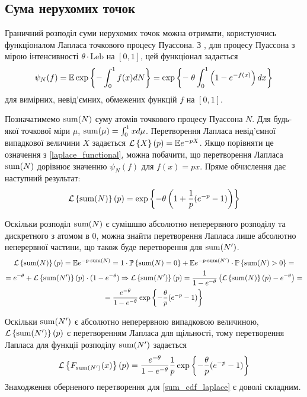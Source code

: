 \subsection{Сума нерухомих точок}
Граничний розподіл суми нерухомих точок можна отримати, користуючись функціоналом Лапласа точкового процесу Пуассона.
З \cite{Resnick_2007}, для процесу Пуассона з мірою інтенсивності $\theta \cdot \mathrm{Leb}$ на $[0, 1]$, цей функціонал задається
\begin{equation}\label{laplace_functional}
    \psi_N(f) = \mathbb{E} \exp\left\{-\int_0^1 f (x) dN \right\}= \exp\left\{ - \; \theta \int_0^1 \left(1 - e^{-f(x)}\right) dx\right\}
\end{equation}
для вимірних, невід'ємних, обмежених функцій $f$ на $[0, 1]$.

Позначатимемо $\operatorname{sum}(N)$ суму атомів точкового процесу Пуассона $N$. 
Для будь-якої точкової міри $\mu$, 
$\operatorname{sum}(\mu) = \int_0^1 x d\mu$. 
Перетворення Лапласа невід'ємної випадкової величини $X$ задається
$\mathcal{L}\left\{X\right\}(p) = \mathbb{E} e^{-pX}$. 
Якщо порівняти це означення з \eqref{laplace_functional}, можна побачити, що
перетворення Лапласа $\operatorname{sum}(N)$ дорівнює значенню $\psi_N(f)$ для $f(x) = px$.
Пряме обчислення дає наступний результат:
\begin{gather}
    \mathcal{L}\left\{\operatorname{sum}(N)\right\}(p) = 
    \exp\left\{- \theta \left( 1 + \frac{1}{p}(e^{-p} - 1)\right) \right\}
\end{gather}

Оскільки розподіл $\operatorname{sum}(N)$ є сумішшю абсолютно неперервного розподілу та
дискретного з атомом в 0, можна знайти перетворення Лапласа
лише абсолютно неперервної частини, що також буде перетворення для
$\operatorname{sum}(N')$.
\begin{gather*}
    \mathcal{L}\left\{\operatorname{sum}(N)\right\}(p) = \mathbb{E} e^{-p\cdot\operatorname{sum}(N)} = 
    1 \cdot \mathbb{P}\left\{\operatorname{sum}(N) = 0\right\} +
    \mathbb{E} e^{-p\cdot\operatorname{sum}(N')} \cdot \mathbb{P}\left\{\operatorname{sum}(N) > 0\right\} = \\ =
    e^{-\theta} + \mathcal{L}\left\{\operatorname{sum}(N')\right\}(p) \cdot (1-e^{-\theta})
    \Rightarrow
    \mathcal{L}\left\{\operatorname{sum}(N')\right\}(p) = \frac{1}{1 - e^{-\theta}}
    \left(\mathcal{L}\left\{\operatorname{sum}(N)\right\}(p) - e^{-\theta}\right) = \\
    = \frac{e^{-\theta}}{1 - e^{-\theta}}
    \exp\left\{- \frac{\theta}{p}(e^{-p} - 1) \right\}
\end{gather*}

Оскільки $\operatorname{sum}(N')$ є абсолютно неперервною випадковою величиною,
$\mathcal{L}\left\{\operatorname{sum}(N')\right\}(p)$ є перетворенням Лапласа для щільності, тому
перетворення Лапласа для функції розподілу $\operatorname{sum}(N')$
задається 
\begin{equation}\label{sum_cdf_laplace}
    \mathcal{L}\left\{F_{\operatorname{sum}(N')}(x)\right\}(p) = 
    \frac{e^{-\theta}}{1 - e^{-\theta}} \frac{1}{p}
    \exp\left\{- \frac{\theta}{p}(e^{-p} - 1) \right\}
\end{equation}
Знаходження оберненого перетворення для \eqref{sum_cdf_laplace}
є доволі складним.

